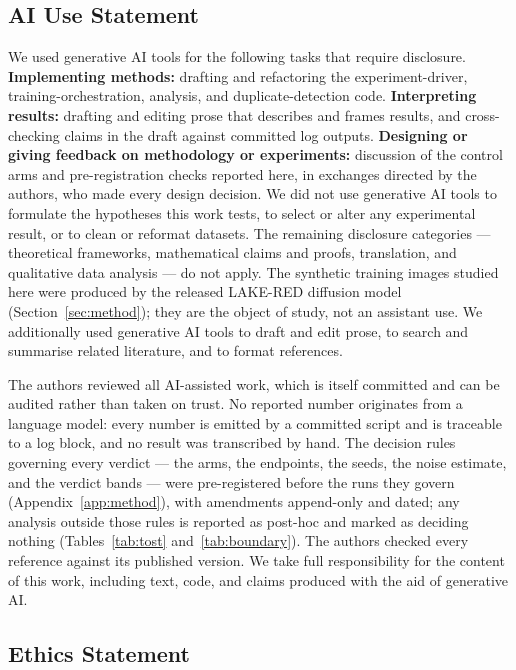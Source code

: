 \documentclass{article}
\begin{document}
\subsection*{AI Use Statement}
We used generative AI tools for the following tasks that require disclosure. \textbf{Implementing
methods:} drafting and refactoring the experiment-driver, training-orchestration, analysis, and
duplicate-detection code. \textbf{Interpreting results:} drafting and editing prose that describes
and frames results, and cross-checking claims in the draft against committed log outputs.
\textbf{Designing or giving feedback on methodology or experiments:} discussion of the control arms
and pre-registration checks reported here, in exchanges directed by the authors, who made every
design decision. We did not use generative AI tools to formulate the hypotheses this work tests, to
select or alter any experimental result, or to clean or reformat datasets. The remaining disclosure
categories --- theoretical frameworks, mathematical claims and proofs, translation, and qualitative
data analysis --- do not apply. The synthetic training images studied here were produced by the
released LAKE-RED diffusion model (Section~\ref{sec:method}); they are the object of study, not an
assistant use. We additionally used generative AI tools to draft and edit prose, to search and
summarise related literature, and to format references.

The authors reviewed all AI-assisted work, which is itself committed and can be audited rather than
taken on trust. No reported number originates from a language model: every number is emitted by a
committed script and is traceable to a log block, and no result was transcribed by hand. The
decision rules governing every verdict --- the arms, the endpoints, the seeds, the noise estimate,
and the verdict bands --- were pre-registered before the runs they govern
(Appendix~\ref{app:method}), with amendments append-only and dated; any analysis outside those rules
is reported as post-hoc and marked as deciding nothing (Tables~\ref{tab:tost}
and~\ref{tab:boundary}). The authors checked every reference against its published version. We take
full responsibility for the content of this work, including text, code, and claims produced with the
aid of generative AI.

\subsection*{Ethics Statement}
\end{document}
